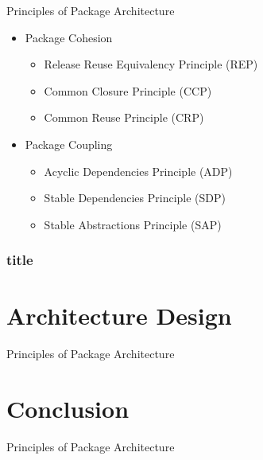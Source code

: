\documentclass[xcolor=svgnames, handout]{beamer}
\begin{document}
\begin{frame}{Principles of Package Architecture}
    \begin{itemize}
        \item<1-> Package Cohesion
            \begin{itemize}
                \item<3-> Release Reuse Equivalency Principle (REP)
                \item<4-> Common Closure Principle (CCP)
                \item<5-> Common Reuse Principle (CRP)
            \end{itemize}
        \item<2-> Package Coupling
            \begin{itemize}
                \item<6-> Acyclic Dependencies Principle (ADP)
                \item<7-> Stable Dependencies Principle (SDP)
                \item<8-> Stable Abstractions Principle (SAP)
            \end{itemize}
    \end{itemize}
\end{frame}


\begin{frame}[t]\frametitle{title}



\end{frame}

\section{Architecture Design}


\begin{frame}{Principles of Package Architecture}
\end{frame}

\section{Conclusion}

\begin{frame}{Principles of Package Architecture}
\end{frame}
\end{document}
